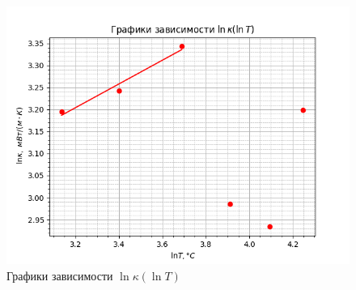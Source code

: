 \documentclass[12pt, a4paper]{article}
\begin{document}
\begin{figure}[H]
\centering
\includegraphics[width=\textwidth]{223_3.png}
\caption{Графики зависимости $\ln\kappa(\ln T)$}
\end{figure}
\end{document}
